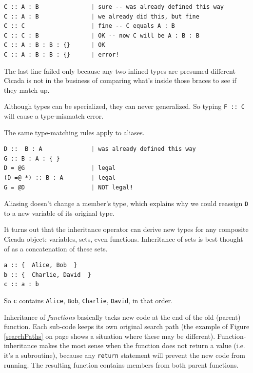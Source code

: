 \documentclass{article}
\newenvironment{code}{
       \begin{list}{}{
               \setlength{\leftmargin}{.4in}
               \setlength{\rightmargin}{0in}
               \setlength{\topsep}{.2in}
       }
       \small
       \item[] }
       { \end{list}   }
\begin{document}
\begin{code} \begin{verbatim}
C :: A : B               | sure -- was already defined this way
C :: A : B               | we already did this, but fine
C :: C                   | fine -- C equals A : B
C :: C : B               | OK -- now C will be A : B : B
C :: A : B : B : {}      | OK
C :: A : B : B : {}      | error!
\end{verbatim} \end{code}

\noindent The last line failed only because any two inlined types are presumed different -- Cicada is not in the business of comparing what's inside those braces to see if they match up.

Although types can be specialized, they can never generalized.  So typing \verb#F :: C# will cause a type-mismatch error.

The same type-matching rules apply to aliases.

\begin{code} \begin{verbatim}
D ::  B : A              | was already defined this way
G :: B : A : { }
D = @G                   | legal
(D =@ *) :: B : A        | legal
G = @D                   | NOT legal!
\end{verbatim} \end{code}

\noindent Aliasing doesn't change a member's type, which explains why we could reassign \verb#D# to a new variable of its original type.

It turns out that the inheritance operator can derive new types for any composite Cicada object:  variables, sets, even functions.  Inheritance of sets is best thought of as a concatenation of these sets.

\begin{code} \begin{verbatim}
a :: {  Alice, Bob  }
b :: {  Charlie, David  }
c :: a : b
\end{verbatim} \end{code}

\noindent So \texttt{c} contains \texttt{Alice}, \texttt{Bob}, \texttt{Charlie}, \texttt{David}, in that order.

Inheritance of \emph{functions} basically tacks new code at the end of the old (parent) function.  Each sub-code keeps its own original search path (the example of Figure \ref{searchPaths} on page \pageref{searchPaths} shows a situation where these may be different).  Function-inheritance makes the most sense when the function does not return a value (i.e. it's a subroutine), because any \verb#return# statement will prevent the new code from running.  The resulting function contains members from both parent functions.
\end{document}
